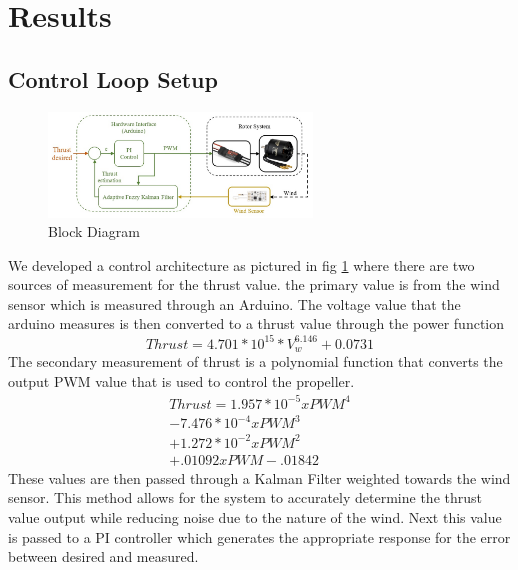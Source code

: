 \documentclass[conference]{IEEEtran}
\begin{document}
\section{Results}
\subsection{Control Loop Setup}
	\begin{figure}[htbp]
	\includegraphics[width=7cm]{images/Figure_2/Block_Diagram.jpg}
	\caption{Block Diagram}
	\label{block_diagram}
\end{figure}
We developed a control architecture as pictured in fig \ref{block_diagram} where there are two sources of measurement for the thrust value. the primary value is from the wind sensor which is measured through an Arduino. The voltage value that the arduino measures is then converted to a thrust value through the power function
\begin{equation}
Thrust = 4.701 * 10^{15} * V_w^{6.146} + 0.0731
\label{wind_power}
\end{equation}
The secondary measurement of thrust is a polynomial function that converts the output PWM value that is used to control the propeller. \newline
\begin{eqnarray}
Thrust = 1.957*10^{-5}xPWM^4 \\
- 7.476*10^{-4}xPWM^3 \nonumber\\ 
+ 1.272*10^{-2}xPWM^2 \nonumber\\
+ .01092xPWM - .01842 \nonumber
\label{pwm_poly}
\end{eqnarray}
These values are then passed through a Kalman Filter weighted towards the wind sensor. This method allows for the system to accurately determine the thrust value output while reducing noise due to the nature of the wind. Next this value is passed to a PI controller which generates the appropriate response for the error between desired and measured. 
\end{document}
